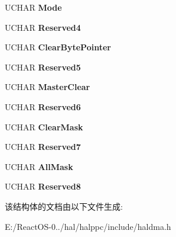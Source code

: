\begin{DoxyCompactItemize}
U\+C\+H\+AR {\bfseries Mode}
\item 
\mbox{\label{struct___d_m_a2___c_o_n_t_r_o_l_af0b0bbee75cd07e88f45f9ab8cf27731}} 
U\+C\+H\+AR {\bfseries Reserved4}
\item 
\mbox{\label{struct___d_m_a2___c_o_n_t_r_o_l_a5faaadfaed4c9bd78db3be4fb9ebd251}} 
U\+C\+H\+AR {\bfseries Clear\+Byte\+Pointer}
\item 
\mbox{\label{struct___d_m_a2___c_o_n_t_r_o_l_a4b389c69cb51784ed0c294b95763e1cb}} 
U\+C\+H\+AR {\bfseries Reserved5}
\item 
\mbox{\label{struct___d_m_a2___c_o_n_t_r_o_l_aa068a8186a7c0609d6653b3c032d957d}} 
U\+C\+H\+AR {\bfseries Master\+Clear}
\item 
\mbox{\label{struct___d_m_a2___c_o_n_t_r_o_l_a860f4e3333f37467e634cbfad9ba14b6}} 
U\+C\+H\+AR {\bfseries Reserved6}
\item 
\mbox{\label{struct___d_m_a2___c_o_n_t_r_o_l_a00078b95b0463a25a02e1725d32e3fa1}} 
U\+C\+H\+AR {\bfseries Clear\+Mask}
\item 
\mbox{\label{struct___d_m_a2___c_o_n_t_r_o_l_aef90382fbfac51569f46d231373c7f0f}} 
U\+C\+H\+AR {\bfseries Reserved7}
\item 
\mbox{\label{struct___d_m_a2___c_o_n_t_r_o_l_ade7458240751d08e809fd8d74d9b8939}} 
U\+C\+H\+AR {\bfseries All\+Mask}
\item 
\mbox{\label{struct___d_m_a2___c_o_n_t_r_o_l_a29547a2a946717c3eb55db931f727486}} 
U\+C\+H\+AR {\bfseries Reserved8}
\end{DoxyCompactItemize}


该结构体的文档由以下文件生成\+:\begin{DoxyCompactItemize}
\item 
E\+:/\+React\+O\+S-\/0../hal/halppc/include/haldma.\+h\end{DoxyCompactItemize}
